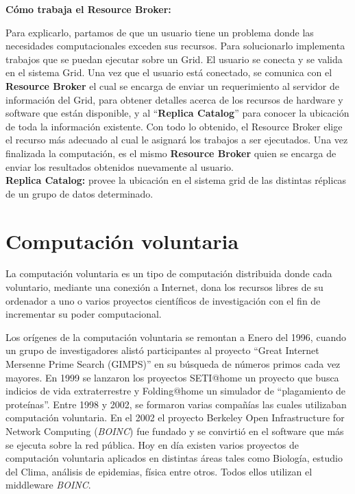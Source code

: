 \textbf{Cómo trabaja el Resource Broker:}

Para explicarlo, partamos de que un usuario tiene un problema donde las necesidades computacionales exceden sus recursos. 
Para solucionarlo implementa trabajos que se puedan ejecutar sobre un Grid. El usuario se conecta y se valida en el sistema Grid. 
Una vez que el usuario está conectado, se comunica con el \textbf{Resource Broker} el cual se encarga de enviar un requerimiento al servidor de información del Grid,
para obtener detalles acerca de los recursos de hardware y software que están disponible, y al “\textbf{Replica Catalog}” para conocer la ubicación de toda la información existente. 
Con todo lo obtenido, el Resource Broker elige el recurso más adecuado al cual le asignará los trabajos a ser ejecutados. 
Una vez finalizada la computación, es el mismo \textbf{Resource Broker} quien se encarga de enviar los resultados obtenidos nuevamente al usuario.\\

\textbf{Replica Catalog:} provee la ubicación en el sistema grid de las distintas réplicas de un grupo de datos determinado. 


\section{Computación voluntaria}

La computación voluntaria es un tipo de computación distribuida donde cada voluntario, mediante una conexión a Internet, dona los recursos libres de su ordenador a uno o varios proyectos científicos de investigación con el fin de incrementar su poder computacional.

Los orígenes de la computación voluntaria se remontan a Enero del 1996, cuando un grupo de investigadores alistó participantes al proyecto “Great Internet Mersenne Prime Search (GIMPS)” en su búsqueda de números primos cada vez mayores.
En 1999 se lanzaron los proyectos SETI@home un proyecto que busca indicios de vida extraterrestre y Folding@home un simulador de “plagamiento de proteínas”. Entre 1998 y 2002, se formaron varias compañías las cuales utilizaban computación voluntaria.  
En el 2002 el proyecto Berkeley Open Infrastructure for Network Computing (\textit{BOINC}) fue fundado y se convirtió en el software que más se ejecuta sobre la red pública. Hoy en día existen varios proyectos de computación voluntaria aplicados en distintas áreas tales como  Biología, estudio del Clima, análisis de epidemias, física entre otros.
 Todos ellos utilizan el middleware \textit{BOINC}.\\

